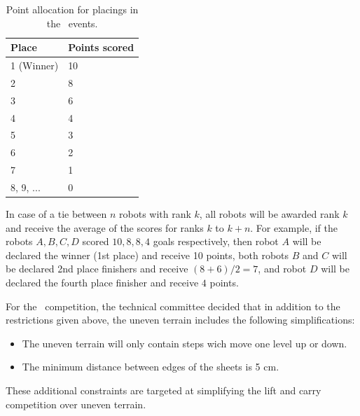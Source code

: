 \documentclass[12pt]{hurocup}
\begin{document}
\begin{lawlist}[LC]
\begin{itemize}
    \begin{table}
      \begin{center}
        \begin{tabular}{l|l}
          \hline
          Place & Points scored \\
          \hline
          1 (Winner) & 10 \\
          2          & 8 \\
          3          & 6 \\
          4          & 4 \\
          5          & 3 \\
          6          & 2 \\
          7          & 1 \\
          8, 9, ...  & 0 \\
          \hline
        \end{tabular}
      \end{center}
      \caption{Point allocation for placings in the \HuroCup\ events.}
      \label{point-allocation}
    \end{table}
  \end{itemize}

\item In case of a tie between $n$ robots with rank $k$, all robots
 will be awarded rank $k$ and receive the average of the scores for
 ranks $k$ to $k+n$.  For example, if the robots $A,B,C,D$ scored $10,
 8, 8, 4$ goals respectively, then robot $A$ will be declared the
 winner (1st place) and receive 10 points, both robots $B$ and $C$
 will be declared 2nd place finishers and receive $(8+6)/2=7$, and
 robot $D$ will be declared the fourth place finisher and receive $4$
 points.

\end{lawlist}

\begin{decisions}
\item For the \thisyear\ competition, the technical committee decided
  that in addition to the restrictions given above, the uneven terrain
  includes the following simplifications:
\begin{itemize}
\item The uneven terrain will only contain steps wich move one level
  up or down.
\item The minimum distance between edges of the sheets is 5 cm.
\end{itemize}
These additional constraints are targeted at simplifying the lift and
carry competition over uneven terrain.

\end{decisions}
\end{document}
